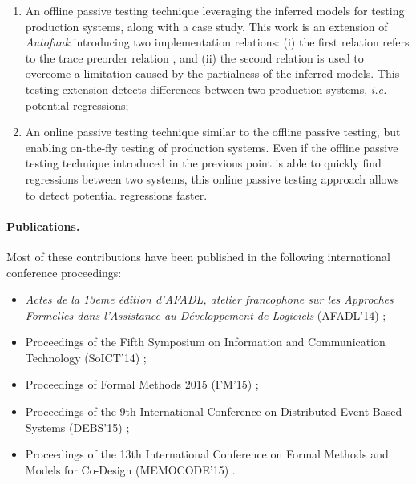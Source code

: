 \begin{enumerate}
    \item An offline passive testing technique leveraging the
        inferred models for testing production systems, along
        with a case study. This work is an extension of
        \textit{Autofunk} introducing two implementation
        relations: (i) the first relation refers to the trace
        preorder relation \cite{DNH84}, and (ii) the second
        relation is used to overcome a limitation caused by the
        partialness of the inferred models. This testing
        extension detects differences between two production
        systems, \emph{i.e.} potential regressions;

    \item An online passive testing technique similar to the
        offline passive testing, but enabling on-the-fly testing
        of production systems. Even if the offline passive
        testing technique introduced in the previous point is
        able to quickly find regressions between two systems,
        this online passive testing approach allows to detect
        potential regressions faster.
\end{enumerate}

\paragraph{Publications.} Most of these contributions have been
published in the following international conference proceedings:

\begin{itemize}
    \item \emph{Actes de la 13eme {\'e}dition d’AFADL, atelier
        francophone sur les Approches Formelles dans l’Assistance au
        D{\'e}veloppement de Logiciels} (AFADL'14)
        \cite{durand2014inference};

    \item Proceedings of the Fifth Symposium on Information and
        Communication Technology (SoICT'14)
        \cite{DBLP:conf/soict/DurandS14};

    \item Proceedings of Formal Methods 2015 (FM'15)
        \cite{DBLP:conf/fm/DurandS15};

    \item Proceedings of the 9th International Conference on
        Distributed Event-Based Systems (DEBS'15)
        \cite{DBLP:conf/debs/SalvaD15};

    \item Proceedings of the 13th International Conference on Formal
        Methods and Models for Co-Design (MEMOCODE'15)
        \cite{7340480}.
\end{itemize}


